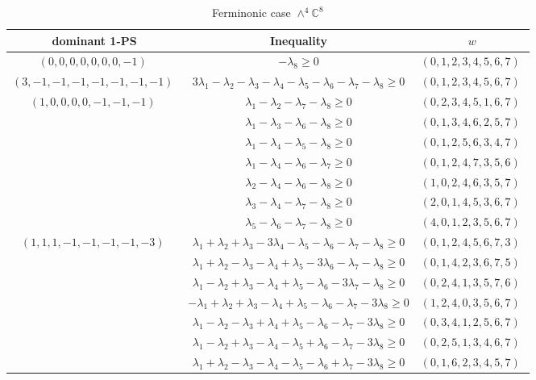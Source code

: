 \documentclass[11pt]{article}
\begin{document}
 
 \begin{longtable}[l]{|c|c|c|} 
 \caption{Ferminonic case $\wedge^{4}\mathbb{C}^{8}$} \\  
 
 \hline 
 \textrm{dominant 1-PS} & \textrm{Inequality} & $w$ \\ 
 \hline\multirow[t]{1}{*}{ $(0 ,0 ,0 ,0 ,0 ,0 ,0 ,-1) \;$ }  & $-\lambda_{8}\geq 0$ & $(0 ,1 ,2 ,3 ,4 ,5 ,6 ,7) \;$\\ \hline\multirow[t]{1}{*}{ $(3 ,-1 ,-1 ,-1 ,-1 ,-1 ,-1 ,-1) \;$ }  & $3\lambda_{1}-\lambda_{2}-\lambda_{3}-\lambda_{4}-\lambda_{5}-\lambda_{6}-\lambda_{7}-\lambda_{8}\geq 0$ & $(0 ,1 ,2 ,3 ,4 ,5 ,6 ,7) \;$\\ \hline\multirow[t]{7}{*}{ $(1 ,0 ,0 ,0 ,0 ,-1 ,-1 ,-1) \;$ }  & $\lambda_{1}-\lambda_{2}-\lambda_{7}-\lambda_{8}\geq 0$ & $(0 ,2 ,3 ,4 ,5 ,1 ,6 ,7) \;$\\ 
 \cline{2-3} 
 & $\lambda_{1}-\lambda_{3}-\lambda_{6}-\lambda_{8}\geq 0$ & $(0 ,1 ,3 ,4 ,6 ,2 ,5 ,7) \;$\\ 
 \cline{2-3} 
 & $\lambda_{1}-\lambda_{4}-\lambda_{5}-\lambda_{8}\geq 0$ & $(0 ,1 ,2 ,5 ,6 ,3 ,4 ,7) \;$\\ 
 \cline{2-3} 
 & $\lambda_{1}-\lambda_{4}-\lambda_{6}-\lambda_{7}\geq 0$ & $(0 ,1 ,2 ,4 ,7 ,3 ,5 ,6) \;$\\ 
 \cline{2-3} 
 & $\lambda_{2}-\lambda_{4}-\lambda_{6}-\lambda_{8}\geq 0$ & $(1 ,0 ,2 ,4 ,6 ,3 ,5 ,7) \;$\\ 
 \cline{2-3} 
 & $\lambda_{3}-\lambda_{4}-\lambda_{7}-\lambda_{8}\geq 0$ & $(2 ,0 ,1 ,4 ,5 ,3 ,6 ,7) \;$\\ 
 \cline{2-3} 
 & $\lambda_{5}-\lambda_{6}-\lambda_{7}-\lambda_{8}\geq 0$ & $(4 ,0 ,1 ,2 ,3 ,5 ,6 ,7) \;$\\ \hline\multirow[t]{7}{*}{ $(1 ,1 ,1 ,-1 ,-1 ,-1 ,-1 ,-3) \;$ }  & $\lambda_{1} + \lambda_{2} + \lambda_{3}-3\lambda_{4}-\lambda_{5}-\lambda_{6}-\lambda_{7}-\lambda_{8}\geq 0$ & $(0 ,1 ,2 ,4 ,5 ,6 ,7 ,3) \;$\\ 
 \cline{2-3} 
 & $\lambda_{1} + \lambda_{2}-\lambda_{3}-\lambda_{4} + \lambda_{5}-3\lambda_{6}-\lambda_{7}-\lambda_{8}\geq 0$ & $(0 ,1 ,4 ,2 ,3 ,6 ,7 ,5) \;$\\ 
 \cline{2-3} 
 & $\lambda_{1}-\lambda_{2} + \lambda_{3}-\lambda_{4} + \lambda_{5}-\lambda_{6}-3\lambda_{7}-\lambda_{8}\geq 0$ & $(0 ,2 ,4 ,1 ,3 ,5 ,7 ,6) \;$\\ 
 \cline{2-3} 
 & $-\lambda_{1} + \lambda_{2} + \lambda_{3}-\lambda_{4} + \lambda_{5}-\lambda_{6}-\lambda_{7}-3\lambda_{8}\geq 0$ & $(1 ,2 ,4 ,0 ,3 ,5 ,6 ,7) \;$\\ 
 \cline{2-3} 
 & $\lambda_{1}-\lambda_{2}-\lambda_{3} + \lambda_{4} + \lambda_{5}-\lambda_{6}-\lambda_{7}-3\lambda_{8}\geq 0$ & $(0 ,3 ,4 ,1 ,2 ,5 ,6 ,7) \;$\\ 
 \cline{2-3} 
 & $\lambda_{1}-\lambda_{2} + \lambda_{3}-\lambda_{4}-\lambda_{5} + \lambda_{6}-\lambda_{7}-3\lambda_{8}\geq 0$ & $(0 ,2 ,5 ,1 ,3 ,4 ,6 ,7) \;$\\ 
 \cline{2-3} 
 & $\lambda_{1} + \lambda_{2}-\lambda_{3}-\lambda_{4}-\lambda_{5}-\lambda_{6} + \lambda_{7}-3\lambda_{8}\geq 0$ & $(0 ,1 ,6 ,2 ,3 ,4 ,5 ,7) \;$\\ \hline
  
 \end{longtable} 
 
\end{document}
